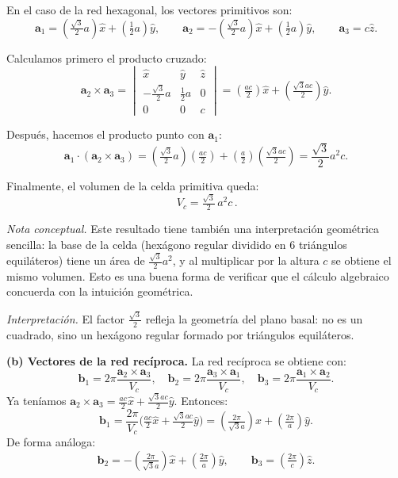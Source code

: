 \documentclass{article}
\begin{document}
\medskip
En el caso de la red hexagonal, los vectores primitivos son:
\[
\mathbf{a}_1 = \left(\tfrac{\sqrt{3}}{2}a\right)\hat{x} + \left(\tfrac{1}{2}a\right)\hat{y}, 
\qquad
\mathbf{a}_2 = -\left(\tfrac{\sqrt{3}}{2}a\right)\hat{x} + \left(\tfrac{1}{2}a\right)\hat{y}, 
\qquad
\mathbf{a}_3 = c \hat{z}.
\]

\medskip
Calculamos primero el producto cruzado:
\[
\mathbf{a}_2 \times \mathbf{a}_3 
= \begin{vmatrix}
\hat{x} & \hat{y} & \hat{z} \\
-\tfrac{\sqrt{3}}{2}a & \tfrac{1}{2}a & 0 \\
0 & 0 & c
\end{vmatrix}
= \left(\tfrac{ac}{2}\right)\hat{x} + \left(\tfrac{\sqrt{3}ac}{2}\right)\hat{y}.
\]

\medskip
Después, hacemos el producto punto con $\mathbf{a}_1$:
\[
\mathbf{a}_1 \cdot (\mathbf{a}_2 \times \mathbf{a}_3) 
= \left(\tfrac{\sqrt{3}}{2}a\right)\left(\tfrac{ac}{2}\right) 
+ \left(\tfrac{a}{2}\right)\left(\tfrac{\sqrt{3}ac}{2}\right)
= \frac{\sqrt{3}}{2}a^2 c.
\]

\medskip
Finalmente, el volumen de la celda primitiva queda:
\[
\boxed{\,V_c = \tfrac{\sqrt{3}}{2}\, a^2 c\,}.
\]

\medskip
\noindent\textit{Nota conceptual.}  
Este resultado tiene también una interpretación geométrica sencilla: la base de la celda 
(hexágono regular dividido en 6 triángulos equiláteros) tiene un área de 
$\tfrac{\sqrt{3}}{2}a^2$, y al multiplicar por la altura $c$ se obtiene el mismo volumen.  
Esto es una buena forma de verificar que el cálculo algebraico concuerda con la intuición geométrica.


\medskip
\noindent\textit{Interpretación.}  
El factor \(\tfrac{\sqrt{3}}{2}\) refleja la geometría del plano basal: no es un cuadrado, sino un hexágono regular formado por triángulos equiláteros.

\bigskip
\textbf{(b) Vectores de la red recíproca.}  
La red recíproca se obtiene con:
\[
\mathbf{b}_1 = 2\pi \frac{\mathbf{a}_2 \times \mathbf{a}_3}{V_c}, \quad
\mathbf{b}_2 = 2\pi \frac{\mathbf{a}_3 \times \mathbf{a}_1}{V_c}, \quad
\mathbf{b}_3 = 2\pi \frac{\mathbf{a}_1 \times \mathbf{a}_2}{V_c}.
\]
Ya teníamos \(\mathbf{a}_2 \times \mathbf{a}_3 = \tfrac{ac}{2}\hat{x} + \tfrac{\sqrt{3}ac}{2}\hat{y}\). Entonces:
\[
\mathbf{b}_1 = \frac{2\pi}{V_c} \Big(\tfrac{ac}{2}\hat{x} + \tfrac{\sqrt{3}ac}{2}\hat{y}\Big)
= \left(\tfrac{2\pi}{\sqrt{3}a}\right)\hat{x} + \left(\tfrac{2\pi}{a}\right)\hat{y}.
\]
De forma análoga:
\[
\mathbf{b}_2 = -\left(\tfrac{2\pi}{\sqrt{3}a}\right)\hat{x} + \left(\tfrac{2\pi}{a}\right)\hat{y}, 
\qquad
\mathbf{b}_3 = \left(\tfrac{2\pi}{c}\right)\hat{z}.
\]
\end{document}
